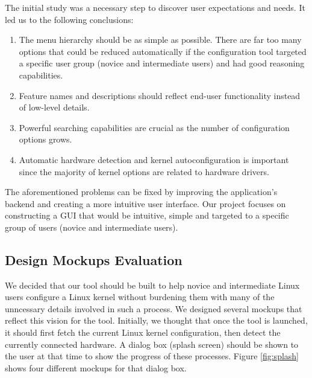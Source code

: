 \documentclass{chi2009}
\begin{document}

The initial study was a necessary step to discover user expectations and needs. It led us to the following conclusions:
\begin{enumerate}
\item The menu hierarchy should be as simple as possible. There are far too many options that could be reduced automatically if the configuration tool targeted
a specific user group (novice and intermediate users) and had good reasoning capabilities.
\item Feature names and descriptions should reflect end-user functionality instead of low-level details.
\item Powerful searching capabilities are crucial as the number of configuration options grows.
\item Automatic hardware detection and kernel autoconfiguration is important since the majority of kernel options are related to hardware drivers.
\end{enumerate}

The aforementioned problems can be fixed by improving the application's backend and creating a more intuitive user interface. Our project focuses on
constructing a GUI that would be intuitive, simple and targeted to a specific group of users (novice and intermediate users).


\subsection{Design Mockups Evaluation}
We decided that our tool should be built to help novice and intermediate Linux users configure a Linux kernel without burdening them with many of the unncessary
details involved in such a process. We designed several mockups that reflect this vision for the tool. Initially, we thought that once the tool is launched, it
should first fetch the current Linux kernel configuration, then detect the currently connected hardware. A dialog box (splash screen) should be shown to the
user at that time to show the progress of these processes. Figure \ref{fig:splash} shows four different mockups for that dialog box.
\end{document}
